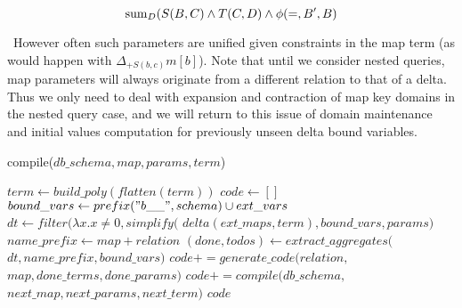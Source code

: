 \[\mathrm{sum}_{D}(S(B,C) \wedge T(C,D) \wedge \phi(=,B',B)\]

\noindent~However often such parameters are unified given constraints in the map
term (as would happen with $\Delta_{+S(b,c)} m[b]$). Note that until we consider
nested queries, map parameters will always originate from a different
relation to that of a delta. Thus we only need to deal with expansion and
contraction of map key domains in the nested query case, and we will return to
this issue of domain maintenance and initial values computation for previously
unseen delta bound variables.

\newcommand{\indentcode}{\hspace{5mm}}
\begin{algorithm}
\caption{compile($db\_schema, map, params, term$)}
\label{alg:compile}
\begin{algorithmic}[1]
  \STATE {}
  \STATE $term \leftarrow build\_poly(flatten(term))$
\ENDIF
\STATE $code \leftarrow []$
  \STATE {}
  \STATE $bound\_vars \leftarrow prefix("b\_\_", schema) \cup ext\_vars$
  \STATE $dt \leftarrow filter(\lambda x. x \neq 0, simplify($
    \STATE \indentcode $delta(ext\_maps,term),bound\_vars, params)$
  \STATE $name\_prefix \leftarrow map+relation$
  \STATE $(done, todos) \leftarrow extract\_aggregates($
    \STATE \indentcode $dt, name\_prefix, bound\_vars)$
     \STATE $code += generate\_code(relation,$
     \STATE \indentcode $map, done\_terms, done\_params)$
  \ENDFOR
  \STATE {}
  \STATE $code += compile(db\_schema, $
  \STATE \indentcode $next\_map, next\_params, next\_term)$
  \ENDFOR
\ENDFOR
\RETURN $code$
\end{algorithmic}
\end{algorithm}

